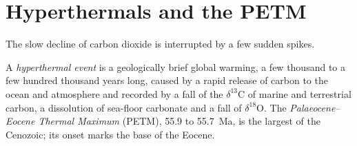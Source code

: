 \section{Hyperthermals and the PETM}\label{sec:b2:deep-time-climate:petm}

The slow decline of carbon dioxide is interrupted by a few sudden spikes.

\begin{definition}\label{def:b2:deep-time-climate:petm}
A \emph{hyperthermal event} is a geologically brief global warming, a few
thousand to a few hundred thousand years long, caused by a rapid release of carbon to the ocean and
atmosphere and recorded by a fall of the $\delta^{13}$C of marine and terrestrial carbon, a
dissolution of sea-floor carbonate and a fall of $\delta^{18}$O. The \emph{Palaeocene--Eocene
Thermal Maximum} (PETM), 55.9 to \qty{55.7}{Ma}, is the
largest of the Cenozoic; its onset marks the base of the Eocene.
\end{definition}

